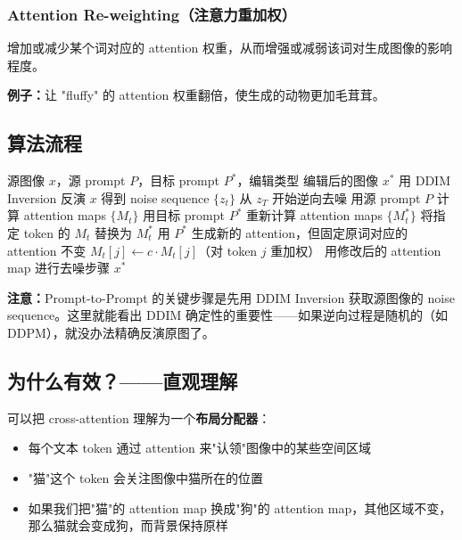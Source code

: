 \documentclass[11pt,a4paper]{article}
\theoremstyle{definition}
\begin{document}
\subsubsection{Attention Re-weighting（注意力重加权）}

增加或减少某个词对应的 attention 权重，从而增强或减弱该词对生成图像的影响程度。

\textbf{例子：}让 "fluffy" 的 attention 权重翻倍，使生成的动物更加毛茸茸。

\subsection{算法流程}

\begin{algorithm}[ht]
\caption{Prompt-to-Prompt Editing}
\label{alg:p2p}
\begin{algorithmic}[1]
\Require 源图像 $x$，源 prompt $P$，目标 prompt $P^*$，编辑类型
\Ensure 编辑后的图像 $x^*$
\State 用 DDIM Inversion 反演 $x$ 得到 noise sequence $\{z_t\}$
\State 从 $z_T$ 开始逆向去噪
    \State 用源 prompt $P$ 计算 attention maps $\{M_t\}$
        \State 用目标 prompt $P^*$ 重新计算 attention maps $\{M_t^*\}$
        \State 将指定 token 的 $M_t$ 替换为 $M_t^*$
        \State 用 $P^*$ 生成新的 attention，但固定原词对应的 attention 不变
        \State $M_t[j] \leftarrow c \cdot M_t[j]$（对 token $j$ 重加权）
    \EndIf
    \State 用修改后的 attention map 进行去噪步骤
\EndFor
\State \Return $x^*$
\end{algorithmic}
\end{algorithm}

\textbf{注意：}Prompt-to-Prompt 的关键步骤是先用 DDIM Inversion 获取源图像的 noise sequence。这里就能看出 DDIM 确定性的重要性——如果逆向过程是随机的（如 DDPM），就没办法精确反演原图了。

\subsection{为什么有效？——直观理解}

可以把 cross-attention 理解为一个\textbf{布局分配器}：
\begin{itemize}
    \item 每个文本 token 通过 attention 来"认领"图像中的某些空间区域
    \item "猫"这个 token 会关注图像中猫所在的位置
    \item 如果我们把"猫"的 attention map 换成"狗"的 attention map，其他区域不变，那么猫就会变成狗，而背景保持原样
\end{itemize}
\end{document}
